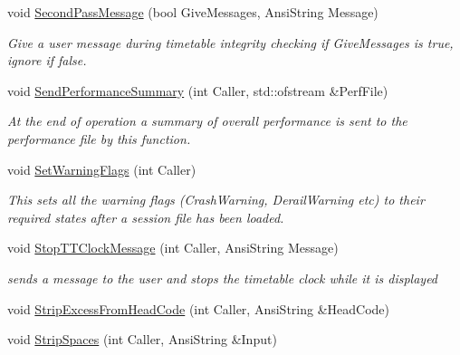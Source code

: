 \begin{DoxyCompactItemize}
void \mbox{\hyperlink{class_t_train_controller_a8df4599a1ae95093241fb707711af894}{Second\+Pass\+Message}} (bool Give\+Messages, Ansi\+String Message)
\begin{DoxyCompactList}\small\item\em Give a user message during timetable integrity checking if Give\+Messages is true, ignore if false. \end{DoxyCompactList}\item 
\mbox{\label{class_t_train_controller_af6c6e1e1236559f07b29b069d4377690}} 
void \mbox{\hyperlink{class_t_train_controller_af6c6e1e1236559f07b29b069d4377690}{Send\+Performance\+Summary}} (int Caller, std\+::ofstream \&Perf\+File)
\begin{DoxyCompactList}\small\item\em At the end of operation a summary of overall performance is sent to the performance file by this function. \end{DoxyCompactList}\item 
\mbox{\label{class_t_train_controller_a29c49509e56368954ca3334a37648a7a}} 
void \mbox{\hyperlink{class_t_train_controller_a29c49509e56368954ca3334a37648a7a}{Set\+Warning\+Flags}} (int Caller)
\begin{DoxyCompactList}\small\item\em This sets all the warning flags (Crash\+Warning, Derail\+Warning etc) to their required states after a session file has been loaded. \end{DoxyCompactList}\item 
\mbox{\label{class_t_train_controller_aba5615209a7dca921e968fca5c52c060}} 
void \mbox{\hyperlink{class_t_train_controller_aba5615209a7dca921e968fca5c52c060}{Stop\+T\+T\+Clock\+Message}} (int Caller, Ansi\+String Message)
\begin{DoxyCompactList}\small\item\em sends a message to the user and stops the timetable clock while it is displayed \end{DoxyCompactList}\item 
void \mbox{\hyperlink{class_t_train_controller_ac47f05f3d0baaf235c430b631c6fd1ad}{Strip\+Excess\+From\+Head\+Code}} (int Caller, Ansi\+String \&Head\+Code)
\item 
void \mbox{\hyperlink{class_t_train_controller_ab0481dd8db0f3f99811f2cdc5b5dfd32}{Strip\+Spaces}} (int Caller, Ansi\+String \&Input)

\end{DoxyCompactItemize}
